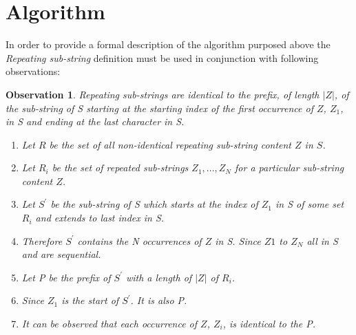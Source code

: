 \documentclass[12pt]{article}
\newtheorem{obser}{Observation}[section]
\begin{document}
\section{Algorithm}
\begin{flushleft} 
	In order to provide a formal description of the algorithm purposed above the \textit{Repeating sub-string} definition must be used in conjunction with following observations:
	\begin{obser} 
	Repeating sub-strings are identical to the prefix, of length $|Z|$, of the sub-string of S starting at the starting index of the first occurrence of $Z$, $Z_{1}$, in S and ending at the last character in S. 
		\begin{enumerate}		
			\item Let $R$ be the set of all non-identical repeating sub-string content $Z$ in $S$.
			\item Let $R_{i}$ be the set of repeated sub-strings ${Z_{1},...,Z_{N}}$ for a particular sub-string content $Z$.
			\item Let $S^{\prime}$ be the sub-string of S which starts at the index of $Z_{1}$ in S of some set $R_{i}$ and extends to last index in S.
			\item Therefore $S^{\prime}$ contains the N occurrences of $Z$ in S. Since $Z{1}$ to $Z_{N}$ all in S and are sequential.
			\item Let P be the prefix of $S^{\prime}$ with a length of $|Z|$ of $R_{i}$.		
			\item Since $Z_{1}$ is the start of $S^{\prime}$. It is also P.
			\item It can be observed that each occurrence of $Z$, $Z_{i}$, is identical to the P.
		\end{enumerate}
	\end{obser}
	

\end{flushleft}
\end{document}
